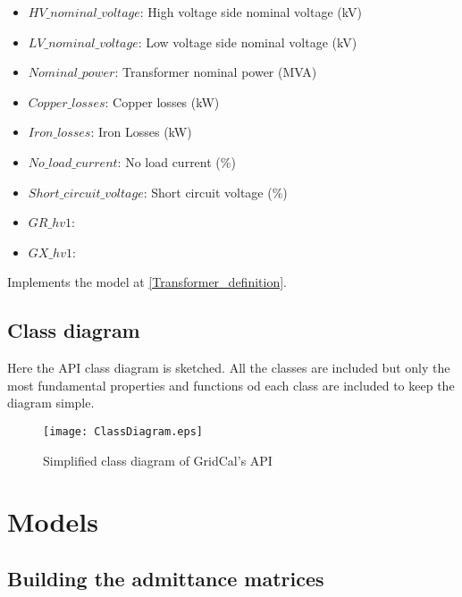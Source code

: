 \documentclass[11pt,fleqn]{book} %
\begin{document}
\begin{itemize}
	\item $HV\_nominal\_voltage$: High voltage side nominal voltage (kV)
	\item $LV\_nominal\_voltage$: Low voltage side nominal voltage (kV)
	\item $Nominal\_power$: Transformer nominal power (MVA)
	\item $Copper\_losses$: Copper losses (kW)
	\item $Iron\_losses$: Iron Losses (kW)
	\item $No\_load\_current$: No load current (\%)
	\item $Short\_circuit\_voltage$: Short circuit voltage (\%)
	\item $GR\_hv1$:
	\item $GX\_hv1$:  \newline
\end{itemize}

Implements the model at \ref{Transformer_definition}.



\section{Class diagram}

Here the API class diagram is sketched. All the classes are included but only the most fundamental properties and functions od each class are included to keep the diagram simple.

\begin{figure}[h]
	\centering
	\texttt{[image: ClassDiagram.eps]}
	\caption{Simplified class diagram of GridCal's API}
	\label{fig:ClassDiagram}
\end{figure}


\chapter{Models}



\section{Building the admittance matrices} \label{admitances_section}
\end{document}
